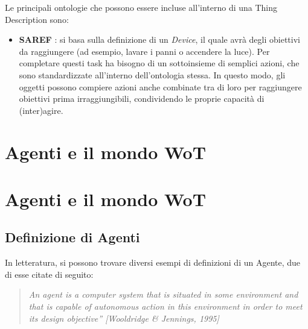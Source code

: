 \documentclass[12pt,a4paper,openright,oneside]{report}
\begin{document}
Le principali ontologie che possono essere incluse all'interno di una Thing Description sono:
\begin{itemize}
	\item \textbf{SAREF} \cite{saref}: si basa sulla definizione di un \textit{Device}, il quale avrà degli obiettivi da raggiungere (ad esempio, lavare i panni o accendere la luce). Per completare questi task ha bisogno di un sottoinsieme di semplici azioni, che sono standardizzate all'interno dell'ontologia stessa. In questo modo, gli oggetti possono compiere azioni anche combinate tra di loro per raggiungere obiettivi prima irraggiungibili, condividendo le proprie capacità di (inter)agire.
\end{itemize}



\clearpage{\pagestyle{empty}\cleardoublepage}
\chapter{Agenti e il mondo WoT}           %
\lhead[\fancyplain{}{\bfseries\thepage}]{\fancyplain{}{\bfseries\rightmark}}  



\clearpage{\pagestyle{empty}\cleardoublepage}
\chapter{Agenti e il mondo WoT}           %
\lhead[\fancyplain{}{\bfseries\thepage}]{\fancyplain{}{\bfseries\rightmark}}  

\section{Definizione di Agenti}
In letteratura, si possono trovare diversi esempi di definizioni di un Agente, due di esse citate di seguito:

\begin{quotation}
	\textit{
	An agent is a computer system that is situated in some
	environment and that is capable of autonomous action in
	this environment in order to meet its design
	objective” [Wooldridge \& Jennings, 1995]}
\end{quotation}
\end{document}
